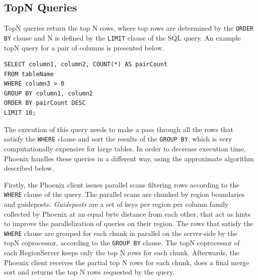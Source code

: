 \subsection{TopN Queries}

TopN queries return the top N rows, where top rows are determined by the \texttt{ORDER BY} clause and N is defined by the \texttt{LIMIT} clause of the SQL query. An example topN query for a pair of columns is presented below.

\begin{lstlisting}[language=PhoenixSQL]
SELECT column1, column2, COUNT(*) AS pairCount
FROM tableName
WHERE column3 > 0
GROUP BY column1, column2
ORDER BY pairCount DESC
LIMIT 10;
\end{lstlisting}

The execution of this query needs to make a pass through all the rows that satisfy the \texttt{WHERE} clause and sort the results of the \texttt{GROUP BY}, which is very computationally expensive for large tables. In order to decrease execution time, Phoenix handles these queries in a different way, using the approximate algorithm described below.

Firstly, the Phoenix client issues parallel scans filtering rows according to the \texttt{WHERE} clause of the query. The parallel scans are chunked by region boundaries and guideposts. \emph{Guideposts} are a set of keys per region per column family collected by Phoenix at an equal byte distance from each other, that act as hints to improve the parallelization of queries on their region. The rows that satisfy the \texttt{WHERE} clause are grouped for each chunk in parallel on the server-side by the topN coprocessor, according to the \texttt{GROUP BY} clause. The topN coprocessor of each RegionServer keeps only the top N rows for each chunk. Afterwards, the Phoenix client receives the partial top N rows for each chunk, does a final merge sort and returns the top N rows requested by the query.


\cleardoublepage
